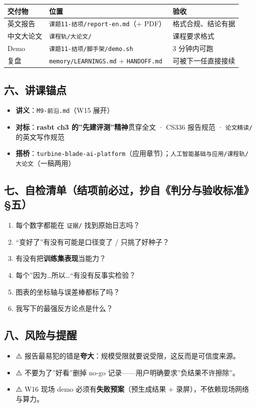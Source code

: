\documentclass[
  chinese,
  11pt,
]{ctexart}
\newcounter{none} %
\providecommand{\tightlist}{%
  \setlength{\itemsep}{0pt}\setlength{\parskip}{0pt}}
\begin{document}
{\def\LTcaptype{none} %
\begin{longtable}[]{@{}lll@{}}
\toprule\noalign{}
交付物 & 位置 & 验收 \\
\midrule\noalign{}
\endhead
\bottomrule\noalign{}
\endlastfoot
英文报告 & \texttt{课题11-结项/report-en.md}（+ PDF） & 格式合规、结论有据 \\
中文大论文 & \texttt{课程轨/大论文/} & 课程要求格式 \\
Demo & \texttt{课题11-结项/脚手架/demo.sh} & 3 分钟内可跑 \\
复盘 & \texttt{memory/LEARNINGS.md} + \texttt{HANDOFF.md} & 可被下一任直接接续 \\
\end{longtable}
}

\subsection{六、讲课锚点}\label{ux516dux8bb2ux8bfeux951aux70b9-8}

\begin{itemize}
\tightlist
\item
  \textbf{讲义}：\texttt{M9-前沿.md}（W15 展开）
\item
  \textbf{对标}：\textbf{rasbt ch3 的''先建评测''精神}贯穿全文 · CS336 报告规范 · \texttt{论文精读/} 的英文写作规范
\item
  \textbf{搭桥}：\texttt{turbine-blade-ai-platform}（应用章节）；\texttt{人工智能基础与应用/课程轨/大论文}（一稿两用）
\end{itemize}

\subsection{七、自检清单（结项前必过，抄自《判分与验收标准》§五）}\label{ux4e03ux81eaux68c0ux6e05ux5355ux7ed3ux9879ux524dux5fc5ux8fc7ux6284ux81eaux5224ux5206ux4e0eux9a8cux6536ux6807ux51c6ux4e94}

\begin{enumerate}
\def\labelenumi{\arabic{enumi}.}
\tightlist
\item
  每个数字都能在 \texttt{证据/} 找到原始日志吗？
\item
  ``变好了''有没有可能是口径变了 / 只挑了好种子？
\item
  有没有把\textbf{训练集表现}当能力？
\item
  每个''因为\ldots 所以\ldots``有没有反事实检验？
\item
  图表的坐标轴与误差棒都标了吗？
\item
  我写下的最强反方论点是什么？
\end{enumerate}

\subsection{八、风险与提醒}\label{ux516bux98ceux9669ux4e0eux63d0ux9192-9}

\begin{itemize}
\tightlist
\item
  ⚠️ 报告最易犯的错是\textbf{夸大}：规模受限就要说受限，这反而是可信度来源。
\item
  ⚠️ 不要为了''好看''删掉 no-go 记录------用户明确要求''负结果不许擦除''。
\item
  ⚠️ W16 现场 demo 必须有\textbf{失败预案}（预生成结果 + 录屏），不依赖现场网络与算力。
\end{itemize}
\end{document}
